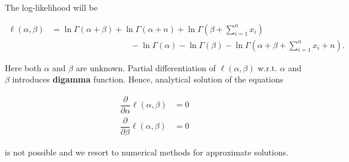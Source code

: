 \documentclass[12pt, a4paper]{article}
\begin{document}
\vspace{0.5cm}

The log-likelihood will be

\begin{align*}
\ell(\alpha, \beta) &= \ln \Gamma(\alpha+\beta) + \ln \Gamma(\alpha + n) + \ln \Gamma\left(\beta + \sum \limits_{i=1}^n x_i\right) \\
&\hspace{4cm} - \ln \Gamma(\alpha) - \ln \Gamma(\beta) - \ln \Gamma\left(\alpha + \beta + \sum \limits_{i=1}^n x_i + n\right).
\end{align*}

Here both $\alpha$ and $\beta$ are unknown. Partial differentiation of $\ell(\alpha, \beta)$ w.r.t. $\alpha$ and $\beta$ introduces \textbf{digamma} function. Hence, analytical solution of the equations

\begin{align*}
\dfrac{\partial}{\partial \alpha} \ell(\alpha, \beta) &= 0 \\[0.5em]
\dfrac{\partial}{\partial \beta} \ell(\alpha, \beta) &= 0
\end{align*}

is not possible and we resort to numerical methods for approximate solutions.
\end{document}
